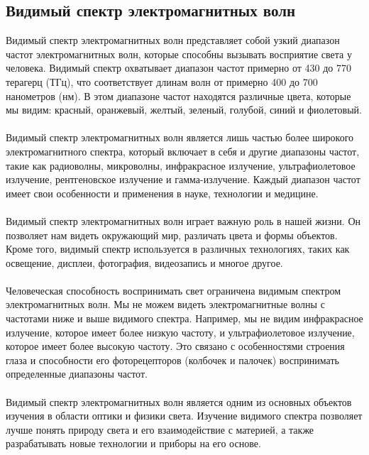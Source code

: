 \documentclass{article}
\begin{document}
\subsection{Видимый спектр электромагнитных волн}
Видимый спектр электромагнитных волн представляет собой узкий диапазон частот электромагнитных волн, которые способны вызывать восприятие света у человека. Видимый спектр охватывает диапазон частот примерно от 430 до 770 терагерц (ТГц), что соответствует длинам волн от примерно 400 до 700 нанометров (нм). В этом диапазоне частот находятся различные цвета, которые мы видим: красный, оранжевый, желтый, зеленый, голубой, синий и фиолетовый.\\
~\\
Видимый спектр электромагнитных волн является лишь частью более широкого электромагнитного спектра, который включает в себя и другие диапазоны частот, такие как радиоволны, микроволны, инфракрасное излучение, ультрафиолетовое излучение, рентгеновское излучение и гамма-излучение. Каждый диапазон частот имеет свои особенности и применения в науке, технологии и медицине.\\
~\\
Видимый спектр электромагнитных волн играет важную роль в нашей жизни. Он позволяет нам видеть окружающий мир, различать цвета и формы объектов. Кроме того, видимый спектр используется в различных технологиях, таких как освещение, дисплеи, фотография, видеозапись и многое другое.\\
~\\
Человеческая способность воспринимать свет ограничена видимым спектром электромагнитных волн. Мы не можем видеть электромагнитные волны с частотами ниже и выше видимого спектра. Например, мы не видим инфракрасное излучение, которое имеет более низкую частоту, и ультрафиолетовое излучение, которое имеет более высокую частоту. Это связано с особенностями строения глаза и способности его фоторецепторов (колбочек и палочек) воспринимать определенные диапазоны частот.\\
~\\
Видимый спектр электромагнитных волн является одним из основных объектов изучения в области оптики и физики света. Изучение видимого спектра позволяет лучше понять природу света и его взаимодействие с материей, а также разрабатывать новые технологии и приборы на его основе.\\
~\\

\newpage
\end{document}
